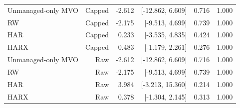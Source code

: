 \begin{table}[p]
\begin{tabular}{lrrrrr}
\hline
Unmanaged-only MVO & Capped & -2.612 & [-12.862, 6.609] & 0.716 & 1.000 \\
RW & Capped & -2.175 & [-9.513, 4.699] & 0.739 & 1.000 \\
HAR & Capped & 0.233 & [-3.535, 4.835] & 0.424 & 1.000 \\
HARX & Capped & 0.483 & [-1.179, 2.261] & 0.276 & 1.000 \\
Unmanaged-only MVO & Raw & -2.612 & [-12.862, 6.609] & 0.716 & 1.000 \\
RW & Raw & -2.175 & [-9.513, 4.699] & 0.739 & 1.000 \\
HAR & Raw & 3.984 & [-3.213, 15.360] & 0.214 & 1.000 \\
HARX & Raw & 0.378 & [-1.304, 2.145] & 0.313 & 1.000 \\
\hline
\end{tabular}
\end{table}
